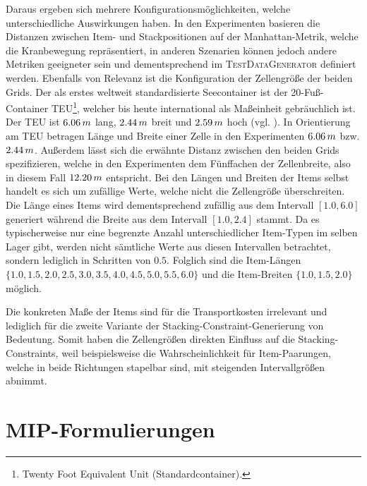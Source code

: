 Daraus ergeben sich mehrere Konfigurationsmöglichkeiten, welche unterschiedliche Auswirkungen haben.
In den Experimenten basieren die Distanzen zwischen Item- und Stackpositionen auf der Manhattan-Metrik,
welche die Kranbewegung repräsentiert, in anderen Szenarien können jedoch andere Metriken geeigneter sein
und dementsprechend im \textsc{TestDataGenerator} definiert werden.
Ebenfalls von Relevanz ist die Konfiguration der Zellengröße der beiden Grids. Der als erstes weltweit standardisierte
Seecontainer ist der 20-Fuß-Container TEU\footnote{Twenty Foot Equivalent Unit (Standardcontainer).},
welcher bis heute international als Maßeinheit gebräuchlich ist. Der TEU ist $6.06 \thinspace m$ lang,
$2.44 \thinspace m$ breit und $2.59 \thinspace m$ hoch (vgl. \citet{ContainerBasis}).
In Orientierung am TEU betragen Länge und Breite einer Zelle in den Experimenten $6.06 \thinspace m$ bzw.
$2.44 \thinspace m$. Außerdem lässt sich die erwähnte Distanz zwischen den beiden Grids spezifizieren,
welche in den Experimenten dem Fünffachen der Zellenbreite, also in diesem Fall $12.20 \thinspace m$ entspricht.
Bei den Längen und Breiten der Items selbst handelt es sich um zufällige Werte, welche nicht die Zellengröße überschreiten.
Die Länge eines Items wird dementsprechend zufällig aus dem Intervall $[1.0, 6.0]$ generiert während die Breite aus dem
Intervall $[1.0, 2.4]$ stammt. Da es typischerweise nur eine begrenzte Anzahl unterschiedlicher Item-Typen im selben Lager
gibt, werden nicht sämtliche Werte aus diesen Intervallen betrachtet, sondern lediglich in Schritten von $0.5$.
Folglich sind die Item-Längen $\{1.0, 1.5, 2.0, 2.5, 3.0, 3.5, 4.0, 4.5, 5.0, 5.5, 6.0\}$ und
die Item-Breiten $\{1.0, 1.5, 2.0\}$ möglich.

 Die konkreten Maße der Items sind für die Transportkosten irrelevant und lediglich
für die zweite Variante der Stacking-Constraint-Generierung von Bedeutung.
Somit haben die Zellengrößen direkten Einfluss auf die Stacking-Constraints,
weil beispielsweise die Wahrscheinlichkeit für Item-Paarungen, welche in beide Richtungen stapelbar sind,
mit steigenden Intervallgrößen abnimmt.

\vfill

\pagebreak

\section{MIP-Formulierungen}
\label{sec:mip_formulations}

